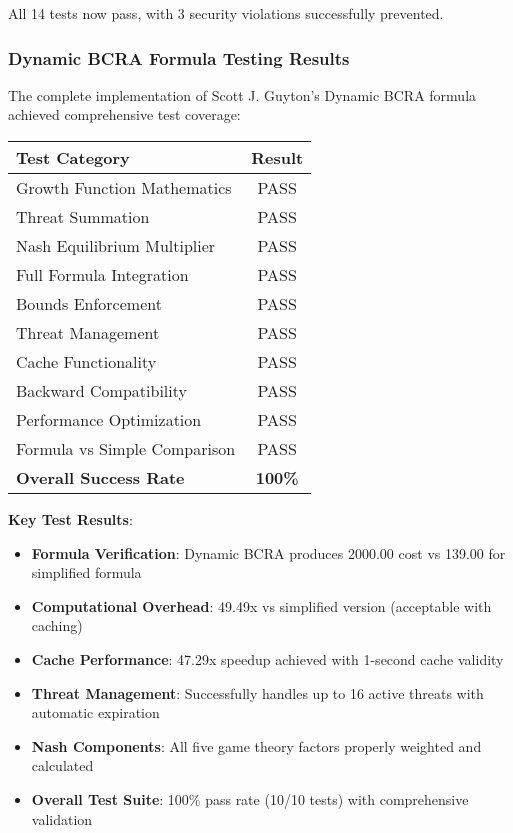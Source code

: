 \documentclass[11pt,a4paper]{article}
\begin{document}
All 14 tests now pass, with 3 security violations successfully prevented.

\subsubsection{Dynamic BCRA Formula Testing Results}

The complete implementation of Scott J. Guyton's Dynamic BCRA formula achieved comprehensive test coverage:

\begin{center}
\begin{tabular}{|l|c|}
\hline
\textbf{Test Category} & \textbf{Result} \\
\hline
Growth Function Mathematics & \textcolor{successgreen}{PASS} \\
Threat Summation & \textcolor{successgreen}{PASS} \\
Nash Equilibrium Multiplier & \textcolor{successgreen}{PASS} \\
Full Formula Integration & \textcolor{successgreen}{PASS} \\
Bounds Enforcement & \textcolor{successgreen}{PASS} \\
Threat Management & \textcolor{successgreen}{PASS} \\
Cache Functionality & \textcolor{successgreen}{PASS} \\
Backward Compatibility & \textcolor{successgreen}{PASS} \\
Performance Optimization & \textcolor{successgreen}{PASS} \\
Formula vs Simple Comparison & \textcolor{successgreen}{PASS} \\
\hline
\textbf{Overall Success Rate} & \textbf{100\%} \\
\hline
\end{tabular}
\end{center}

\textbf{Key Test Results}:
\begin{itemize}
    \item \textbf{Formula Verification}: Dynamic BCRA produces 2000.00 cost vs 139.00 for simplified formula
    \item \textbf{Computational Overhead}: 49.49x vs simplified version (acceptable with caching)
    \item \textbf{Cache Performance}: 47.29x speedup achieved with 1-second cache validity
    \item \textbf{Threat Management}: Successfully handles up to 16 active threats with automatic expiration
    \item \textbf{Nash Components}: All five game theory factors properly weighted and calculated
    \item \textbf{Overall Test Suite}: 100\% pass rate (10/10 tests) with comprehensive validation
\end{itemize}
\end{document}
